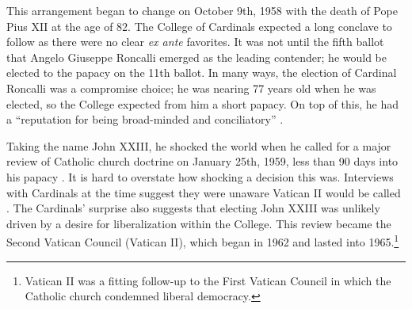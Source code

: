 This arrangement began to change on October 9th, 1958 with the death of Pope Pius XII at the age of 82. The College of Cardinals expected a long conclave to follow as there were no clear \textit{ex ante} favorites. It was not until the fifth ballot that Angelo Giuseppe Roncalli emerged as the leading contender; he would be elected to the papacy on the 11th ballot. In many ways, the election of Cardinal Roncalli was a compromise choice; he was nearing 77 years old when he was elected, so the College expected from him a short papacy. On top of this, he had a ``reputation for being broad-minded and conciliatory'' \citep{Hofmann1958}.
	
Taking the name John XXIII, he shocked the world when he called for a major review of Catholic church doctrine on January 25th, 1959, less than 90 days into his papacy \citep{Alberigo2005}.  It is hard to overstate how shocking a decision this was.  Interviews with Cardinals at the time suggest they were unaware Vatican II would be called \citep{Alberigo2005}. The Cardinals' surprise also suggests that electing John XXIII was unlikely driven by a desire for liberalization within the College.  This review became the Second Vatican Council (Vatican II), which began in 1962 and lasted into 1965.\footnote{Vatican II was a fitting follow-up to the First Vatican Council in which the Catholic church condemned liberal democracy.}
	
